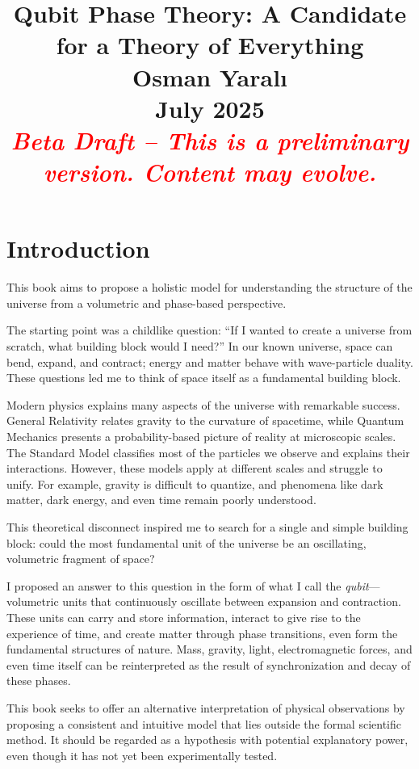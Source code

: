 \documentclass[12pt]{report} %
\title{
\Huge Qubit Phase Theory: A Candidate for a Theory of Everything\\[1em]
\Large Osman Yaralı\\[1em]
\large July 2025\\[1em]
\textcolor{red}{\textit{Beta Draft – This is a preliminary version. Content may evolve.}}
}
\author{}
\date{}
\begin{document}
\maketitle
\thispagestyle{empty}

\newpage
{}
\tableofcontents

\newpage
{}

\chapter{Introduction}

This book aims to propose a holistic model for understanding the structure of the universe from a volumetric and phase-based perspective.

The starting point was a childlike question: “If I wanted to create a universe from scratch, what building block would I need?” In our known universe, space can bend, expand, and contract; energy and matter behave with wave-particle duality. These questions led me to think of space itself as a fundamental building block.

Modern physics explains many aspects of the universe with remarkable success. General Relativity relates gravity to the curvature of spacetime, while Quantum Mechanics presents a probability-based picture of reality at microscopic scales. The Standard Model classifies most of the particles we observe and explains their interactions. However, these models apply at different scales and struggle to unify. For example, gravity is difficult to quantize, and phenomena like dark matter, dark energy, and even time remain poorly understood.

This theoretical disconnect inspired me to search for a single and simple building block: could the most fundamental unit of the universe be an oscillating, volumetric fragment of space?

I proposed an answer to this question in the form of what I call the \textit{qubit}—volumetric units that continuously oscillate between expansion and contraction. These units can carry and store information, interact to give rise to the experience of time, and create matter through phase transitions, even form the fundamental structures of nature. Mass, gravity, light, electromagnetic forces, and even time itself can be reinterpreted as the result of synchronization and decay of these phases.

This book seeks to offer an alternative interpretation of physical observations by proposing a consistent and intuitive model that lies outside the formal scientific method. It should be regarded as a hypothesis with potential explanatory power, even though it has not yet been experimentally tested.
\end{document}
